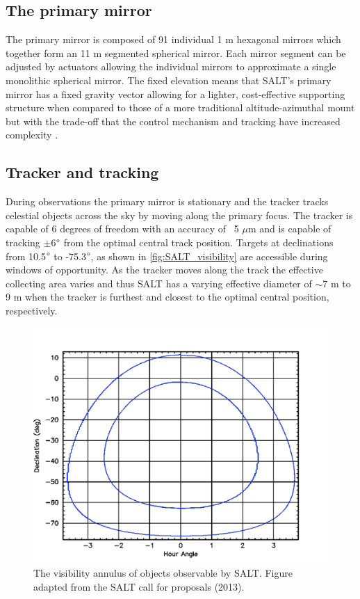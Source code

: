 \subsection{The primary mirror}

The primary mirror is composed of 91 individual 1 m hexagonal mirrors which together form an 11 m segmented spherical mirror. Each mirror segment can be adjusted by actuators allowing the individual mirrors to approximate a single monolithic spherical mirror. The fixed elevation means that SALT's primary mirror has a fixed gravity vector allowing for a lighter, cost-effective supporting structure when compared to those of a more traditional altitude-azimuthal mount but with the trade-off that the control mechanism and tracking have increased complexity \citep{SALT_design}.

\subsection{Tracker and tracking}

During observations the primary mirror is stationary and the tracker tracks celestial objects across the sky by moving along the primary focus. The tracker is capable of 6 degrees of freedom with an accuracy of ~5 $\mu$m and is capable of tracking $\pm$6$\degree$ from the optimal central track position. Targets at declinations from 10.5$\degree$ to -75.3$\degree$, as shown in \autoref{fig:SALT_visibility} are accessible during windows of opportunity. As the tracker moves along the track the effective collecting area varies and thus SALT has a varying effective diameter of $\sim7$ m to 9 m when the tracker is furthest and closest to the optimal central position, respectively.

\begin{figure}[t]
    \centering
    \includegraphics[width = 1.0 \textwidth]{figures/2_SALT_visibility.png}
    \caption{The visibility annulus of objects observable by SALT. Figure adapted from the SALT call for proposals (2013).\protect\footnotemark}
    \label{fig:SALT_visibility}
\end{figure}

